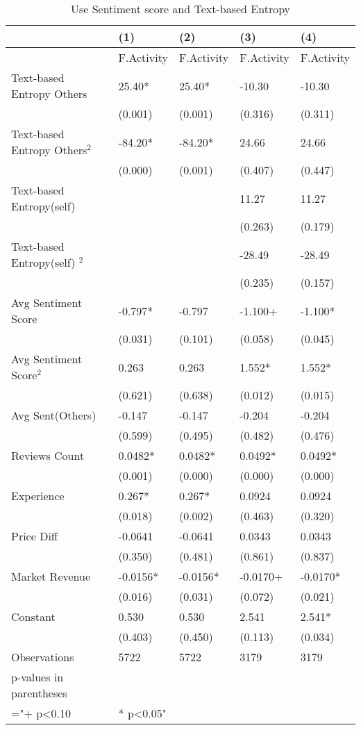 \begin{table}[]
\centering
\begin{tabular}{@{}lllll@{}}
\toprule
 & (1) & (2) & (3) & (4) \\ \midrule
 & F.Activity & F.Activity & F.Activity & F.Activity \\
Text-based Entropy Others & 25.40* & 25.40* & -10.30 & -10.30 \\
 & (0.001) & (0.001) & (0.316) & (0.311) \\
Text-based Entropy Others$^2$ & -84.20* & -84.20* & 24.66 & 24.66 \\
 & (0.000) & (0.001) & (0.407) & (0.447) \\
Text-based Entropy(self) &  &  & 11.27 & 11.27 \\
 &  &  & (0.263) & (0.179) \\
Text-based Entropy(self) $^2$ &  &  & -28.49 & -28.49 \\
 &  &  & (0.235) & (0.157) \\
Avg Sentiment Score & -0.797* & -0.797 & -1.100+ & -1.100* \\
 & (0.031) & (0.101) & (0.058) & (0.045) \\
Avg Sentiment Score$^2$ & 0.263 & 0.263 & 1.552* & 1.552* \\
 & (0.621) & (0.638) & (0.012) & (0.015) \\
Avg Sent(Others) & -0.147 & -0.147 & -0.204 & -0.204 \\
 & (0.599) & (0.495) & (0.482) & (0.476) \\
Reviews Count & 0.0482* & 0.0482* & 0.0492* & 0.0492* \\
 & (0.001) & (0.000) & (0.000) & (0.000) \\
Experience & 0.267* & 0.267* & 0.0924 & 0.0924 \\
 & (0.018) & (0.002) & (0.463) & (0.320) \\
Price Diff & -0.0641 & -0.0641 & 0.0343 & 0.0343 \\
 & (0.350) & (0.481) & (0.861) & (0.837) \\
Market Revenue & -0.0156* & -0.0156* & -0.0170+ & -0.0170* \\
 & (0.016) & (0.031) & (0.072) & (0.021) \\
Constant & 0.530 & 0.530 & 2.541 & 2.541* \\
 & (0.403) & (0.450) & (0.113) & (0.034) \\
Observations & 5722 & 5722 & 3179 & 3179 \\
p-values in parentheses &  &  &  &  \\
="+ p\textless{}0.10 & * p\textless{}0.05" &  &  &  \\ \bottomrule
\end{tabular}
\caption{Use Sentiment score and Text-based Entropy}
\label{reg_ind_4}
\end{table}